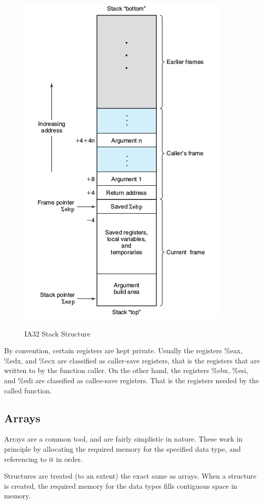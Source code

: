      \begin{figure}
         \centering
         \includegraphics[scale=0.75]{./img/stack2.png}
         \label{img:stack}
         \caption{IA32 Stack Structure}
     \end{figure}

     By convention, certain registers are kept private. Usually the registers {\ttfamily \%eax}, {\ttfamily \%edx}, and {\ttfamily \%ecx} are classified as caller-save registers, that is the registers that are written to by the function caller. On the other hand, the registers {\ttfamily \%ebx}, {\ttfamily \%esi}, and {\ttfamily \%edi} are classified as callee-save registers. That is the registers needed by the called function.

    \subsection{Arrays}
    Arrays are a common tool, and are fairly simplistic in nature. These work in principle by allocating the required memory for the specified data type, and referencing to it in order.

    Structures are treated (to an extent) the exact same as arrays. When a structure is created, the required memory for the data types fills contiguous space in memory.

\newpage


